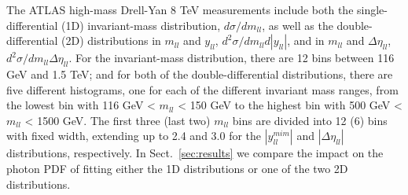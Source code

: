 The ATLAS high-mass Drell-Yan 8 TeV measurements include both the
single-differential (1D) invariant-mass distribution,
$d\sigma/dm_{ll}$, as well as the double-differential (2D)
distributions in $m_{ll}$ and $y_{ll}$,
$d^{2}\sigma/dm_{ll}d|y_{ll}|$, and in $m_{ll}$ and $\Delta\eta_{ll}$,
$d^{2}\sigma/dm_{ll}\Delta\eta_{ll}$.
%
For the invariant-mass distribution, there are 12 bins between 116 GeV
and 1.5 TeV; and for both of the double-differential distributions,
there are five different histograms, one for each of the different
invariant mass ranges, from the lowest bin with 116 GeV < $m_{ll}$ <
150 GeV to the highest bin with 500 GeV < $m_{ll}$ < 1500 GeV.
The first three (last two) $m_{ll}$ bins are divided into 12 (6) bins
with fixed width, extending up to 2.4 and 3.0 for the $|y_{ll}^{mim}|$
and $|\Delta\eta_{ll}|$ distributions, respectively.
%
In Sect.~\ref{sec:results} we compare the impact on the photon PDF of
fitting either the 1D distributions or one of the two 2D
distributions.

